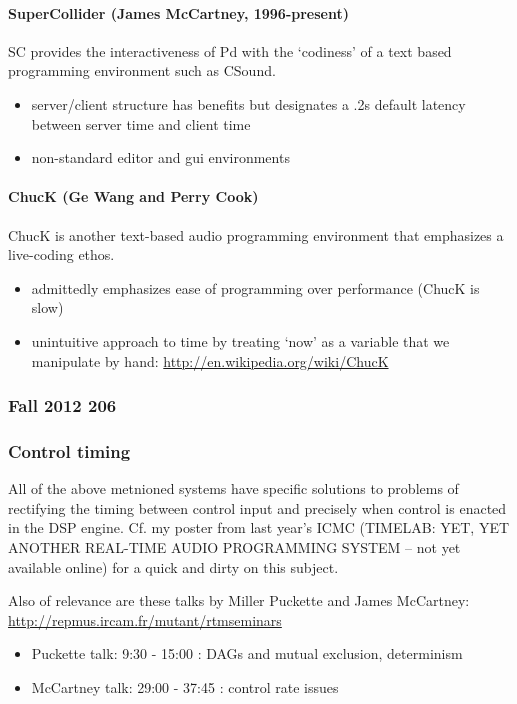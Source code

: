 \documentclass{article}
\begin{document}
\paragraph{SuperCollider (James McCartney, 1996-present)}
SC provides the interactiveness of Pd with the `codiness' of a text based programming environment such as CSound.
\begin{itemize}
\item server/client structure has benefits but designates a .2s default latency between server time and client time%
\item non-standard editor and gui environments 
\end{itemize}

\paragraph{ChucK (Ge Wang and Perry Cook)}
ChucK is another text-based audio programming environment that emphasizes a live-coding ethos. 
\begin{itemize}
\item admittedly emphasizes ease of programming over performance (ChucK is slow)
\item unintuitive approach to time by treating `now' as a variable that we manipulate by hand: \url{http://en.wikipedia.org/wiki/ChucK}
\end{itemize}

\subsubsection{Fall 2012 206}
\subsubsection{Control timing}
All of the above metnioned systems have specific solutions to problems of rectifying the timing between control input and precisely when control is enacted in the DSP engine. Cf. my poster from last year's ICMC (TIMELAB: YET, YET ANOTHER REAL-TIME AUDIO PROGRAMMING SYSTEM -- not yet available online) for a quick and dirty on this subject.

Also of relevance are these talks by Miller Puckette and James McCartney:
\url{http://repmus.ircam.fr/mutant/rtmseminars}
\begin{itemize}
\item Puckette talk: 9:30 - 15:00 : DAGs and mutual exclusion, determinism
\item McCartney talk: 29:00 - 37:45 : control rate issues
\end{itemize}
\end{document}
